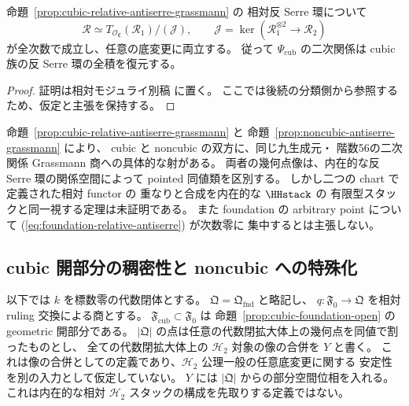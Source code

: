 \begin{corollary}
\label{cor:cubic-relative-full-quadratic-presentation}
命題~\ref{prop:cubic-relative-antiserre-grassmann} の
相対反 Serre 環について
\[
 \mathscr R\simeq
 T_{\mathcal O_{\mathfrak C}}(\mathscr R_1)/(\mathscr J),
 \qquad
 \mathscr J=\ker(\mathscr R_1^{\otimes2}\to\mathscr R_2)
 \tag{C-quad}\label{eq:cubic-relative-full-quadratic}
\]
が全次数で成立し、任意の底変更に両立する。
従って $\Psi_{\mathrm{cub}}$ の二次関係は
cubic 族の反 Serre 環の全積を復元する。
\end{corollary}
\begin{proof}
証明は相対モジュライ別稿 \cite[\texttt{foundation_stack} 節]{QuadricModuli2026} に置く。
ここでは後続の分類側から参照するため、仮定と主張を保持する。
\end{proof}

\begin{remark}
命題~\ref{prop:cubic-relative-antiserre-grassmann} と
命題~\ref{prop:noncubic-antiserre-grassmann} により、
cubic と noncubic の双方に、同じ九生成元・
階数56の二次関係 Grassmann 商への具体的な射がある。
両者の幾何点像は、内在的な反 Serre 環の関係空間によって
pointed 同値類を区別する。
しかし二つの chart で定義された相対 functor の
重なりと合成を内在的な $\HHstack$ の
有限型スタックと同一視する定理は未証明である。
また foundation の arbitrary point について
(\ref{eq:foundation-relative-antiserre}) が次数零に
集中するとは主張しない。
\end{remark}

\subsection{cubic 開部分の稠密性と noncubic への特殊化}
\label{subsec:cubic-noncubic-components}

以下では $k$ を標数零の代数閉体とする。
$\mathfrak Q=\mathfrak Q_{\mathrm{fnd}}$ と略記し、
$q:\mathfrak F_0\to\mathfrak Q$ を相対 ruling 交換による商とする。
$\mathfrak F_{\mathrm{cub}}\subset\mathfrak F_0$ は
命題~\ref{prop:cubic-foundation-open} の geometric 開部分である。
$|\mathfrak Q|$ の点は任意の代数閉拡大体上の幾何点を同値で割ったものとし、
全ての代数閉拡大体上の $\mathcal H_2$ 対象の像の合併を $Y$ と書く。
これは像の合併としての定義であり、$\mathcal H_2$ 公理一般の任意底変更に関する
安定性を別の入力として仮定していない。
$Y$ には $|\mathfrak Q|$ からの部分空間位相を入れる。
これは内在的な相対 $\mathcal H_2$ スタックの構成を先取りする定義ではない。

